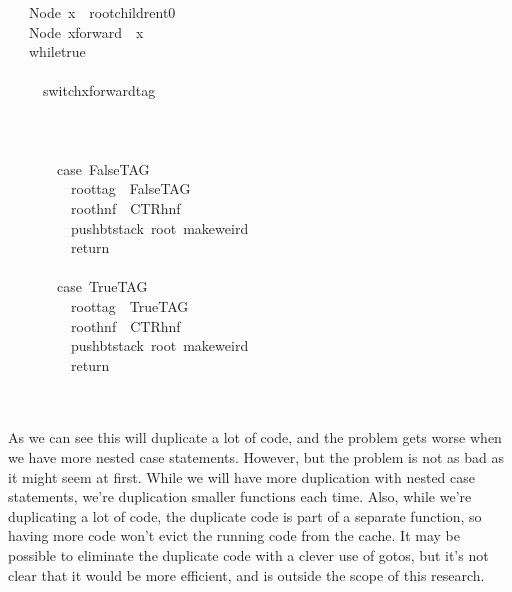 \documentclass{book}
\theoremstyle{definition}
\begin{document}
{\begin{tabbing}
\ttfamily ~~~Node~x~~rootchildrent0\\
\ttfamily ~~~Node~xforward~~x\\
\ttfamily ~~~whiletrue\\
\ttfamily ~~~\\
\ttfamily ~~~~~switchxforwardtag\\
\ttfamily ~~~~~\\
\ttfamily ~~~~~~~\\
\ttfamily ~\\
\ttfamily ~~~~~~~case~FalseTAG\\
\ttfamily ~~~~~~~~~roottag~~FalseTAG\\
\ttfamily ~~~~~~~~~roothnf~~CTRhnf\\
\ttfamily ~~~~~~~~~pushbtstack~root~makeweird\\
\ttfamily ~~~~~~~~~return\\
\ttfamily ~\\
\ttfamily ~~~~~~~case~TrueTAG\\
\ttfamily ~~~~~~~~~roottag~~TrueTAG\\
\ttfamily ~~~~~~~~~roothnf~~CTRhnf\\
\ttfamily ~~~~~~~~~pushbtstack~root~makeweird\\
\ttfamily ~~~~~~~~~return\\
\ttfamily ~~~~~\\
\ttfamily ~
\end{tabbing}

As we can see this will duplicate a lot of code,
and the problem gets worse when we have more nested case statements.
However, but the problem is not as bad as it might seem at first.
While we will have more duplication with nested case statements,
we're duplication smaller functions each time.
Also, while we're duplicating a lot of code,
the duplicate code is part of a separate function,
so having more code won't evict the running code from the cache.
It may be possible to eliminate the duplicate code with a clever use of gotos,
but it's not clear that it would be more efficient, and is outside the scope of this research.

}
\end{document}
